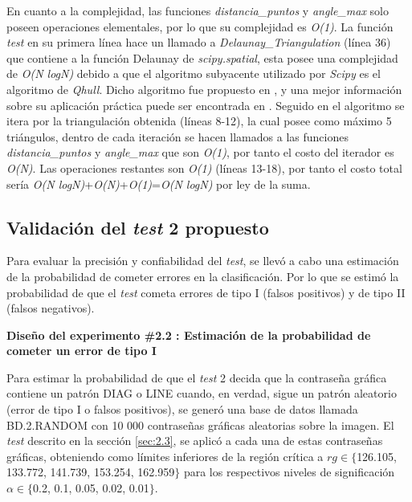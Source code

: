 \documentclass[12pt]{report}
\begin{document}
En cuanto a la complejidad, las funciones \textit{distancia\_puntos} y \textit{angle\_max} solo poseen operaciones elementales, por lo que su complejidad es \textit{O(1)}. La función\textit{ test} en su primera línea hace un llamado a  \textit{Delaunay\_Triangulation} (línea 36) que  contiene a la función Delaunay de \textit{scipy.spatial}, esta posee una complejidad de \textit{O(N logN)} debido a que el algoritmo subyacente utilizado por \textit{Scipy} es el algoritmo de \textit{Qhull}. Dicho algoritmo fue propuesto en \cite{31}, y una mejor información sobre su aplicación práctica puede ser encontrada en \cite{32}. Seguido en el algoritmo se itera por la triangulación obtenida (líneas 8-12), la cual posee como máximo 5 triángulos, dentro de cada iteración se hacen llamados a las  funciones \textit{distancia\_puntos} y \textit{angle\_max}  que son \textit{O(1)}, por tanto el costo del iterador es \textit{O(N)}. Las operaciones restantes son \textit{O(1)} (líneas 13-18), por tanto el costo total sería \textit{O(N logN)}+\textit{O(N)}+\textit{O(1)}=\textit{O(N logN)} por ley de la suma.

\subsection{Validación del \textit{test} 2 propuesto}
\label{sec:2.4}

Para evaluar la precisión y confiabilidad del \textit{test}, se llevó a cabo una estimación de la probabilidad de cometer errores en la clasificación. Por lo que se estimó la probabilidad de que el \textit{test} cometa  errores de tipo I (falsos positivos) y de tipo II (falsos negativos).

\textbf{Diseño del experimento \#2.2 : Estimación de la probabilidad de cometer un error de tipo I} 

Para estimar la probabilidad de que el \textit{test} 2 decida que la contraseña gráfica contiene un patrón DIAG o LINE cuando, en verdad, sigue un patrón aleatorio (error de tipo I o falsos positivos), se generó una base de datos llamada BD.2.RANDOM con 10 000 contraseñas gráficas aleatorias sobre la imagen. El \textit{test} descrito en la sección \ref{sec:2.3}, se aplicó a cada una de estas contraseñas gráficas, obteniendo como límites inferiores de la región crítica a  $rg \in \{$126.105, 133.772, 141.739, 153.254, 162.959$\}$ para los respectivos  niveles de significación $\alpha \in \{$0.2, 0.1, 0.05, 0.02, 0.01$\}$.
\end{document}
